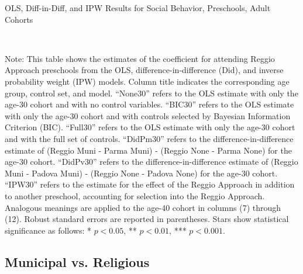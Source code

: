 \begin{landscape}
\begin{table}[H] \caption{OLS, Diff-in-Diff, and IPW Results for Social Behavior, Preschools, Adult Cohorts} \label{ols-S-reg}
\scalebox{0.80}{
}
\vspace{1ex} \\
\footnotesize\raggedright{Note: This table shows the estimates of the coefficient for attending Reggio Approach preschools from the OLS, difference-in-difference (Did), and inverse probability weight (IPW) models. Column title indicates the corresponding age group, control set, and model. ``None30'' refers to the OLS estimate with only the age-30 cohort and with no control variables. ``BIC30'' refers to the OLS estimate with only the age-30 cohort and with controls selected by Bayesian Information Criterion (BIC). ``Full30'' refers to the OLS estimate with only the age-30 cohort and with the full set of controls. ``DidPm30'' refers to the difference-in-difference estimate of (Reggio Muni - Parma Muni) - (Reggio None - Parma None) for the age-30 cohort. ``DidPv30'' refers to the difference-in-difference estimate of (Reggio Muni - Padova Muni) - (Reggio None - Padova None) for the age-30 cohort. ``IPW30'' refers to the estimate for the effect of the Reggio Approach in addition to another preschool, accounting for selection into the Reggio Approach. Analogous meanings are applied to the age-40 cohort in columns (7) through (12). Robust standard errors are reported in parentheses. Stars show statistical significance as follows: * $p < 0.05$, ** $p < 0.01$, *** $p < 0.001$.}
\end{table}









\subsection{Municipal vs. Religious}\label{appendix:religious}

\end{landscape}
